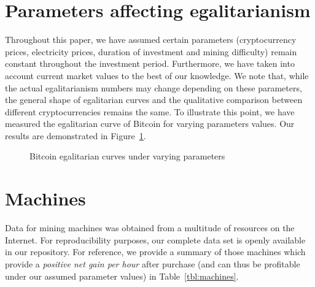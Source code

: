 \section{Parameters affecting egalitarianism}\label{sec:appendix-qualitative-difference}

Throughout this paper, we have assumed certain parameters (cryptocurrency
prices, electricity prices, duration of investment and mining difficulty) remain
constant throughout the investment period. Furthermore, we have taken into account
current market values to the best of our knowledge. We note that, while the
actual egalitarianism numbers may change depending on these parameters, the
general shape of egalitarian curves and the qualitative comparison between
different cryptocurrencies remains the same. To illustrate this point, we have
measured the egalitarian curve of Bitcoin for varying parameters values. Our
results are demonstrated in Figure~\ref{fig:different-settings}.

\begin{figure}
  \caption{Bitcoin egalitarian curves under varying parameters}
  \label{fig:different-settings}
\end{figure}

\section{Machines}\label{sec:appendix-data}

Data for mining machines was obtained from a multitude of resources on the
Internet. For reproducibility purposes, our complete data set is openly
available in our repository. For reference, we provide a summary of those
machines which provide a \emph{positive net gain per hour} after purchase (and
can thus be profitable under our assumed parameter values) in
Table~\ref{tbl:machines}.


